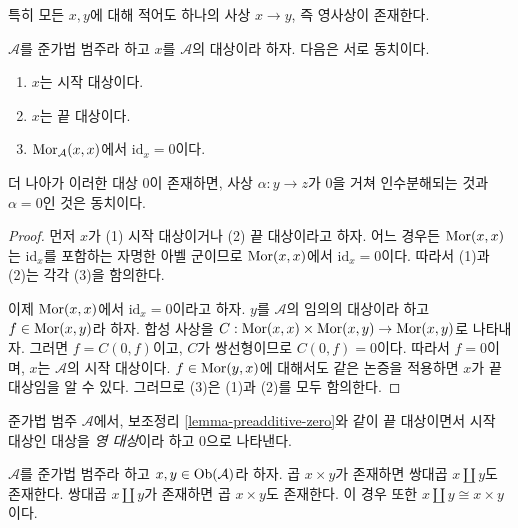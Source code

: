 \noindent
특히 모든 $x, y$에 대해 적어도 하나의 사상 $x \to y$, 즉 영사상이 존재한다.

\begin{lemma}
\label{lemma-preadditive-zero}
$\mathcal{A}$를 준가법 범주라 하고 $x$를 $\mathcal{A}$의 대상이라 하자.
다음은 서로 동치이다.
\begin{enumerate}
\item $x$는 시작 대상이다.
\item $x$는 끝 대상이다.
\item $\mathop{\mathrm{Mor}}\nolimits_\mathcal{A}(x, x)$에서 $\text{id}_x = 0$이다.
\end{enumerate}
더 나아가 이러한 대상 $0$이 존재하면, 사상 $\alpha : y \to z$가
$0$을 거쳐 인수분해되는 것과 $\alpha = 0$인 것은 동치이다.
\end{lemma}

\begin{proof}
먼저 $x$가 (1) 시작 대상이거나 (2) 끝 대상이라고 하자.
어느 경우든 $\mathop{\mathrm{Mor}}\nolimits(x,x)$는 $\text{id}_x$를 포함하는 자명한 아벨 군이므로
$\mathop{\mathrm{Mor}}\nolimits(x, x)$에서 $\text{id}_x = 0$이다. 따라서 (1)과 (2)는 각각 (3)을
함의한다.

\medskip\noindent
이제 $\mathop{\mathrm{Mor}}\nolimits(x,x)$에서 $\text{id}_x = 0$이라고 하자. $y$를
$\mathcal{A}$의 임의의 대상이라 하고 $f \in \mathop{\mathrm{Mor}}\nolimits(x ,y)$라 하자.
합성 사상을 $C : \mathop{\mathrm{Mor}}\nolimits(x,x) \times \mathop{\mathrm{Mor}}\nolimits(x,y) \to \mathop{\mathrm{Mor}}\nolimits(x,y)$로 나타내자.
그러면 $f = C(0, f)$이고, $C$가 쌍선형이므로 $C(0, f) = 0$이다.
따라서 $f = 0$이며, $x$는 $\mathcal{A}$의 시작 대상이다.
$f \in \mathop{\mathrm{Mor}}\nolimits(y, x)$에 대해서도 같은 논증을 적용하면 $x$가 끝 대상임을
알 수 있다. 그러므로 (3)은 (1)과 (2)를 모두 함의한다.
\end{proof}




\begin{definition}
\label{definition-zero-object}
준가법 범주 $\mathcal{A}$에서, 보조정리 \ref{lemma-preadditive-zero}와 같이
끝 대상이면서 시작 대상인 대상을 {\it 영 대상}이라 하고 $0$으로 나타낸다.
\end{definition}

\begin{lemma}
\label{lemma-preadditive-direct-sum}
$\mathcal{A}$를 준가법 범주라 하고 $x, y \in \mathop{\mathrm{Ob}}\nolimits(\mathcal{A})$라 하자.
곱 $x \times y$가 존재하면 쌍대곱 $x \amalg y$도 존재한다.
쌍대곱 $x \amalg y$가 존재하면 곱 $x \times y$도 존재한다.
이 경우 또한 $x \amalg y \cong x \times y$이다.
\end{lemma}

